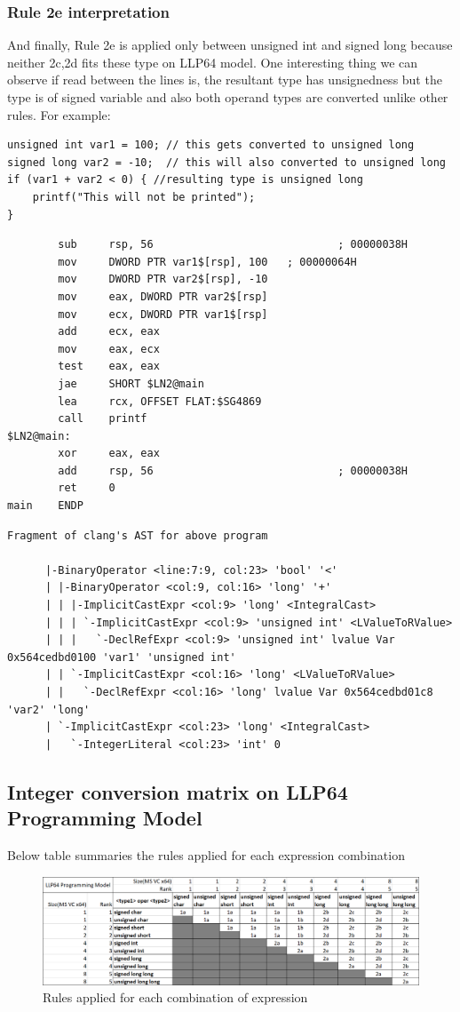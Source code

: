 \documentclass{article}
\begin{document}
\subsubsection{Rule 2e interpretation}
And finally, Rule 2e is applied only between unsigned int and signed long
because neither 2c,2d fits these type on LLP64 model. One interesting thing we
can observe if read between the lines is, the resultant type has unsignedness
but the type is of signed variable and also both operand types are converted
unlike other rules.
For example:
\begin{verbatim}
unsigned int var1 = 100; // this gets converted to unsigned long
signed long var2 = -10;  // this will also converted to unsigned long
if (var1 + var2 < 0) { //resulting type is unsigned long
    printf("This will not be printed");
}
\end{verbatim}
\begin{verbatim}
        sub     rsp, 56                             ; 00000038H
        mov     DWORD PTR var1$[rsp], 100   ; 00000064H
        mov     DWORD PTR var2$[rsp], -10
        mov     eax, DWORD PTR var2$[rsp]
        mov     ecx, DWORD PTR var1$[rsp]
        add     ecx, eax
        mov     eax, ecx
        test    eax, eax
        jae     SHORT $LN2@main
        lea     rcx, OFFSET FLAT:$SG4869
        call    printf
$LN2@main:
        xor     eax, eax
        add     rsp, 56                             ; 00000038H
        ret     0
main    ENDP
\end{verbatim}
\begin{verbatim}
Fragment of clang's AST for above program

      |-BinaryOperator <line:7:9, col:23> 'bool' '<'
      | |-BinaryOperator <col:9, col:16> 'long' '+'
      | | |-ImplicitCastExpr <col:9> 'long' <IntegralCast>
      | | | `-ImplicitCastExpr <col:9> 'unsigned int' <LValueToRValue>
      | | |   `-DeclRefExpr <col:9> 'unsigned int' lvalue Var 0x564cedbd0100 'var1' 'unsigned int'
      | | `-ImplicitCastExpr <col:16> 'long' <LValueToRValue>
      | |   `-DeclRefExpr <col:16> 'long' lvalue Var 0x564cedbd01c8 'var2' 'long'
      | `-ImplicitCastExpr <col:23> 'long' <IntegralCast>
      |   `-IntegerLiteral <col:23> 'int' 0
\end{verbatim}

\subsection{Integer conversion matrix on LLP64 Programming Model}
Below table summaries the rules applied for each expression combination
\begin{figure}[H]
\centering
\includegraphics[width=\textwidth]{Integer-Arithmetic-All-Datatypes.png}
\caption{Rules applied for each combination of expression}
\end{figure}
\end{document}
